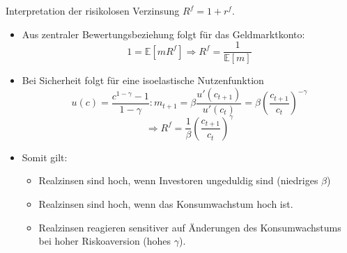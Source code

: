 \documentclass[12pt]{extreport} %
\theoremstyle{named}
\theoremstyle{nnamed}
\theoremstyle{itshape}
\theoremstyle{normal}
\begin{document}
Interpretation der risikolosen Verzinsung $R^f = 1 + r^f$.
\begin{itemize}
	\item Aus zentraler Bewertungsbeziehung folgt für das Geldmarktkonto:
		$$ 1 = \mathbb{E} \left[ m R^f \right] \Rightarrow R^f = \frac{1}{\mathbb{E}[m]} $$
	\item Bei Sicherheit folgt für eine isoelastische Nutzenfunktion
		$$ u(c) = \frac{c^{1-\gamma} - 1}{1 - \gamma}: m_{t+1} = \beta \frac{u'(c_{t+1})}{u'(c_{t})} = \beta \left( \frac{c_{t+1}}{c_t} \right)^{-\gamma} $$
		$$ \Rightarrow R^f = \frac{1}{\beta} \left( \frac{c_{t+1}}{c_t} \right)^{\gamma} $$
	\item Somit gilt:
		\begin{itemize}
			\item Realzinsen sind hoch, wenn Investoren ungeduldig sind (niedriges $\beta$)
			\item Realzinsen sind hoch, wenn das Konsumwachstum hoch ist.
			\item Realzinsen reagieren sensitiver auf Änderungen des Konsumwachstums bei hoher Riskoaversion (hohes $\gamma$).
		\end{itemize}
\end{itemize}
	
\end{document}
